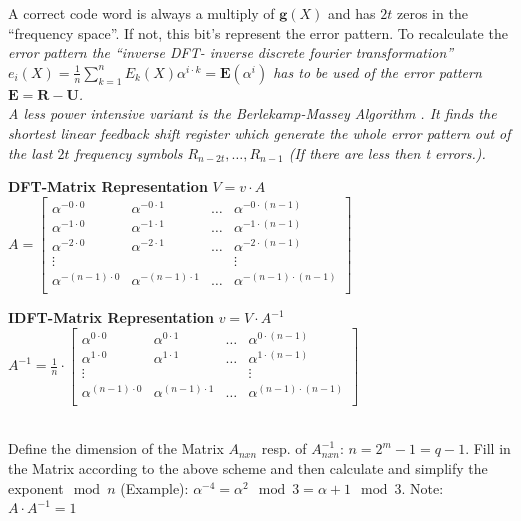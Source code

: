 A correct code word is always a multiply of $\bm g(X)$ and has $2t$ zeros in the ``frequency space''. If not, this bit's represent the error pattern. 
To recalculate the \em error pattern \em the ``inverse DFT- inverse discrete fourier transformation'' 
$e_i(X)=\frac{1}{n}\sum\limits_{k=1}^n E_k(X) \alpha^{i \cdot k}=\bm E(\alpha^i)$ has to be used of the error pattern $\bm E= \bm R - \bm U$.\\
A less power intensive variant is the \em Berlekamp-Massey Algorithm \em. It finds the shortest linear feedback shift register which generate the 
whole error pattern out of the last $2t$ frequency symbols $R_{n-2t},\ldots,R_{n-1}$ (If there are less then t errors.).

\begin{minipage}{9cm}
\textbf{DFT-Matrix Representation}
$V=v \cdot A$\\
 $A=\begin{bmatrix} 	
    	\alpha^{-0\cdot 0}		& \alpha^{-0\cdot 1}		& 	\ldots	&\alpha^{-0\cdot (n-1)}	\\
    	\alpha^{-1\cdot 0}		& \alpha^{-1\cdot 1}		& 	\ldots	&\alpha^{-1\cdot (n-1)}	\\
    	\alpha^{-2\cdot 0}		& \alpha^{-2\cdot 1}		&	\ldots	&\alpha^{-2\cdot (n-1)}	\\
    	\vdots					&							&			& \vdots				\\
    	\alpha^{-(n-1)\cdot 0}	& \alpha^{-(n-1)\cdot 1}	&  	\ldots	&\alpha^{-(n-1)\cdot (n-1)}	\\
    \end{bmatrix}$  \\    
\end{minipage}
\begin{minipage}{9cm}
\textbf{IDFT-Matrix Representation}
$v=V \cdot A^{-1}$\\
 $A^{-1}=\frac{1}{n}\cdot \begin{bmatrix} 	
    	\alpha^{0\cdot 0}		& \alpha^{0\cdot 1}		& 	\ldots	&\alpha^{0\cdot (n-1)}	\\
    	\alpha^{1\cdot 0}		& \alpha^{1\cdot 1}		& 	\ldots	&\alpha^{1\cdot (n-1)}	\\
    	\vdots					&						&			& \vdots			\\
    	\alpha^{(n-1)\cdot 0}	& \alpha^{(n-1)\cdot 1}	&	\ldots	&\alpha^{(n-1)\cdot (n-1)}	\\
    \end{bmatrix}$  \\    
\end{minipage}\\
Define the dimension of the Matrix $A_{nxn}$ resp. of $A_{nxn}^{-1}$: $n = 2^m - 1 = q - 1$. Fill in the Matrix according to the above scheme and then 
calculate and simplify the exponent$\mod n$ (Example): $\alpha^{-4}=\alpha^2 \mod 3=\alpha + 1 \mod 3$. Note: $A \cdot A^{-1}=1$\\

